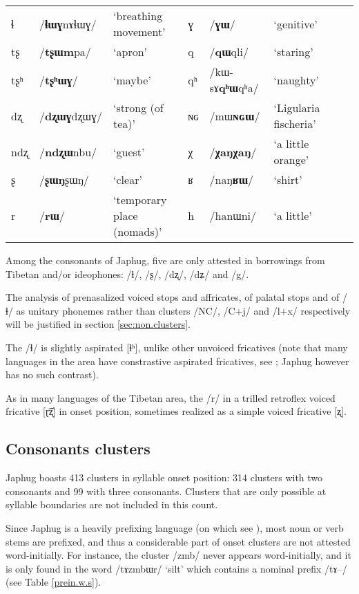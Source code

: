 \documentclass[oldfontcommands,oneside,a4paper,11pt]{article}
\newcommand{\ipa}[1]{{\phon/#1/}} %
\begin{document}
\begin{table}
{\begin{tabular}{lll|lllll}
ɬ   & 	  \ipa{\textbf{ɬɯɣ}nɤɬɯɣ}   & 	 `breathing movement' & 	ɣ & 	\ipa{\textbf{ɣɯ}}   & 	 `genitive' \\ 
tʂ   & 	 \ipa{\textbf{tʂɯm}pa}   & 	 `apron' & 	q & 	\ipa{\textbf{qɯ}qli}   & 	 `staring' \\ 
tʂʰ   & 	  \ipa{\textbf{tʂʰɯɣ}}   & 	 `maybe' & 	qʰ & 	\ipa{kɯ-sɤ\textbf{qʰɯ}qʰa}   & 	 `naughty' \\ 
dʐ   & 	\ipa{\textbf{dʐɯɣ}dʐɯɣ}   & 	 `strong (of tea)' & 	ɴɢ & 	\ipa{mɯ\textbf{ɴɢɯ}}  & 	 `Ligularia fischeria' \\ 
ndʐ & 	\ipa{\textbf{ndʐɯ}nbu}   & 	 `guest' & 	χ & 	\ipa{\textbf{χaŋχaŋ}}   & 	 `a little orange' \\ 
ʂ & 	\ipa{\textbf{ʂɯŋ}ʂɯŋ}   & 	 `clear' & 	ʁ & 	\ipa{naŋ\textbf{ʁɯ}}   & 	 `shirt' \\ 
r & 	\ipa{\textbf{rɯ}}   & 	 `temporary place (nomads)' & 	  h&\ipa{hanɯni} 	 & `a little'	 \\ 
\bottomrule
\end{tabular}}
\end{table}

Among the consonants of Japhug, five are only attested in borrowings from Tibetan and/or ideophones: /ɬ/, /ʂ/, /dʐ/, /dʑ/ and /g/.

The analysis of prenasalized voiced stops and affricates, of palatal stops and of /ɬ/ as unitary phonemes rather than clusters /NC/, /C+j/ and /l+x/ respectively will be justified in section \ref{sec:non.clusters}. 

The /ɬ/ is slightly aspirated [ɬʰ], unlike other unvoiced fricatives (note that many languages in the area have constrastive aspirated fricatives, see \citealt{jacques11lingua}; Japhug however has no such contrast).


As in many languages of the Tibetan area, the /r/ in a trilled retroflex voiced fricative [ɽ͡ʐ] in onset position, sometimes realized as a simple voiced fricative [ʐ].


  \subsection{Consonants clusters} \label{sec:clusters}
  Japhug boasts 413 clusters in syllable onset position:  314 clusters with two consonants and 99 with three consonants. Clusters that are only possible at syllable boundaries are not included in this count. 
  
  Since Japhug is a heavily prefixing language (on which see \citealt{jacques13harmonization}), most noun or verb stems are prefixed, and thus a considerable part of onset clusters are not attested word-initially. For instance, the cluster \ipa{zmb} never appears word-initially, and it is only found in the word \ipa{tɤzmbɯr}  `silt' which contains a nominal prefix \ipa{tɤ--} (see Table \ref{prein.w.s}). 
  
\end{document}
